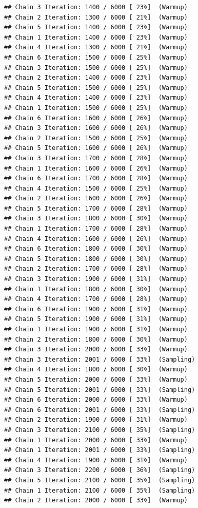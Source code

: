 \documentclass[
]{article}
\begin{document}
\begin{verbatim}
## Chain 3 Iteration: 1400 / 6000 [ 23%]  (Warmup) 
## Chain 2 Iteration: 1300 / 6000 [ 21%]  (Warmup) 
## Chain 5 Iteration: 1400 / 6000 [ 23%]  (Warmup) 
## Chain 1 Iteration: 1400 / 6000 [ 23%]  (Warmup) 
## Chain 4 Iteration: 1300 / 6000 [ 21%]  (Warmup) 
## Chain 6 Iteration: 1500 / 6000 [ 25%]  (Warmup) 
## Chain 3 Iteration: 1500 / 6000 [ 25%]  (Warmup) 
## Chain 2 Iteration: 1400 / 6000 [ 23%]  (Warmup) 
## Chain 5 Iteration: 1500 / 6000 [ 25%]  (Warmup) 
## Chain 4 Iteration: 1400 / 6000 [ 23%]  (Warmup) 
## Chain 1 Iteration: 1500 / 6000 [ 25%]  (Warmup) 
## Chain 6 Iteration: 1600 / 6000 [ 26%]  (Warmup) 
## Chain 3 Iteration: 1600 / 6000 [ 26%]  (Warmup) 
## Chain 2 Iteration: 1500 / 6000 [ 25%]  (Warmup) 
## Chain 5 Iteration: 1600 / 6000 [ 26%]  (Warmup) 
## Chain 3 Iteration: 1700 / 6000 [ 28%]  (Warmup) 
## Chain 1 Iteration: 1600 / 6000 [ 26%]  (Warmup) 
## Chain 6 Iteration: 1700 / 6000 [ 28%]  (Warmup) 
## Chain 4 Iteration: 1500 / 6000 [ 25%]  (Warmup) 
## Chain 2 Iteration: 1600 / 6000 [ 26%]  (Warmup) 
## Chain 5 Iteration: 1700 / 6000 [ 28%]  (Warmup) 
## Chain 3 Iteration: 1800 / 6000 [ 30%]  (Warmup) 
## Chain 1 Iteration: 1700 / 6000 [ 28%]  (Warmup) 
## Chain 4 Iteration: 1600 / 6000 [ 26%]  (Warmup) 
## Chain 6 Iteration: 1800 / 6000 [ 30%]  (Warmup) 
## Chain 5 Iteration: 1800 / 6000 [ 30%]  (Warmup) 
## Chain 2 Iteration: 1700 / 6000 [ 28%]  (Warmup) 
## Chain 3 Iteration: 1900 / 6000 [ 31%]  (Warmup) 
## Chain 1 Iteration: 1800 / 6000 [ 30%]  (Warmup) 
## Chain 4 Iteration: 1700 / 6000 [ 28%]  (Warmup) 
## Chain 6 Iteration: 1900 / 6000 [ 31%]  (Warmup) 
## Chain 5 Iteration: 1900 / 6000 [ 31%]  (Warmup) 
## Chain 1 Iteration: 1900 / 6000 [ 31%]  (Warmup) 
## Chain 2 Iteration: 1800 / 6000 [ 30%]  (Warmup) 
## Chain 3 Iteration: 2000 / 6000 [ 33%]  (Warmup) 
## Chain 3 Iteration: 2001 / 6000 [ 33%]  (Sampling) 
## Chain 4 Iteration: 1800 / 6000 [ 30%]  (Warmup) 
## Chain 5 Iteration: 2000 / 6000 [ 33%]  (Warmup) 
## Chain 5 Iteration: 2001 / 6000 [ 33%]  (Sampling) 
## Chain 6 Iteration: 2000 / 6000 [ 33%]  (Warmup) 
## Chain 6 Iteration: 2001 / 6000 [ 33%]  (Sampling) 
## Chain 2 Iteration: 1900 / 6000 [ 31%]  (Warmup) 
## Chain 3 Iteration: 2100 / 6000 [ 35%]  (Sampling) 
## Chain 1 Iteration: 2000 / 6000 [ 33%]  (Warmup) 
## Chain 1 Iteration: 2001 / 6000 [ 33%]  (Sampling) 
## Chain 4 Iteration: 1900 / 6000 [ 31%]  (Warmup) 
## Chain 3 Iteration: 2200 / 6000 [ 36%]  (Sampling) 
## Chain 5 Iteration: 2100 / 6000 [ 35%]  (Sampling) 
## Chain 1 Iteration: 2100 / 6000 [ 35%]  (Sampling) 
## Chain 2 Iteration: 2000 / 6000 [ 33%]  (Warmup) 

\end{verbatim}
\end{document}
